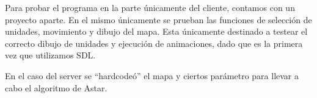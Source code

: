 Para probar el programa en la parte únicamente del cliente, contamos con un
proyecto aparte. En el mismo únicamente se prueban las funciones de selección de
unidades, movimiento y dibujo del mapa. Esta únicamente destinado a testear el
correcto dibujo de unidades y ejecución de animaciones, dado que es la primera
vez que utilizamos SDL.

En el caso del server se “hardcodeó” el mapa y ciertos parámetro para llevar a
cabo el algoritmo de Astar.